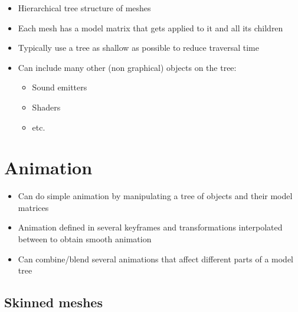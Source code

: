 \documentclass[a4paper]{article}
\begin{document}
\begin{itemize}
  \item
    Hierarchical tree structure of meshes

  \item
    Each mesh has a model matrix that gets applied to it and all its children

  \item
    Typically use a tree as shallow as possible to reduce traversal time

  \item
    Can include many other (non graphical) objects on the tree:

    \begin{itemize}
      \item Sound emitters
      \item Shaders
      \item etc.
    \end{itemize}

\end{itemize}

\section{Animation}

\begin{itemize}
  \item
    Can do simple animation by manipulating a tree of objects and their model
    matrices

  \item
    Animation defined in several keyframes and transformations interpolated
    between to obtain smooth animation

  \item
    Can combine/blend several animations that affect different parts of a model
    tree

\end{itemize}

\subsection{Skinned meshes}
\end{document}
